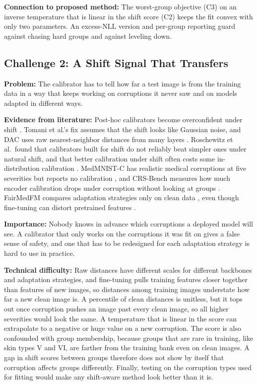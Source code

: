 \documentclass[sigconf,nonacm]{acmart}
\begin{document}
\textbf{Connection to proposed method:} The worst-group objective (C3) on an inverse temperature that is linear in the shift score (C2) keeps the fit convex with only two parameters. An excess-NLL version and per-group reporting guard against chasing hard groups and against leveling down.

\subsection{Challenge 2: A Shift Signal That Transfers}
\label{sec:ch2}

\textbf{Problem:} The calibrator has to tell how far a test image is from the training data in a way that keeps working on corruptions it never saw and on models adapted in different ways.

\textbf{Evidence from literature:} Post-hoc calibrators become overconfident under shift \cite{ovadia2019trust,tomani2021posthoc}. Tomani et al.'s fix assumes that the shift looks like Gaussian noise, and DAC uses raw nearest-neighbor distances from many layers \cite{tomani2023dac}. Roschewitz et al.\ found that calibrators built for shift do not reliably beat simpler ones under natural shift, and that better calibration under shift often costs some in-distribution calibration \cite{roschewitz2025where}. MedMNIST-C has realistic medical corruptions at five severities but reports no calibration \cite{disalvo2024medmnistc}, and CRS-Bench measures how much encoder calibration drops under corruption without looking at groups \cite{lin2026crsbench}. FairMedFM compares adaptation strategies only on clean data \cite{jin2024fairmedfm}, even though fine-tuning can distort pretrained features \cite{kumar2022finetuning}.

\textbf{Importance:} Nobody knows in advance which corruptions a deployed model will see. A calibrator that only works on the corruptions it was fit on gives a false sense of safety, and one that has to be redesigned for each adaptation strategy is hard to use in practice.

\textbf{Technical difficulty:} Raw distances have different scales for different backbones and adaptation strategies, and fine-tuning pulls training features closer together than features of new images, so distances among training images understate how far a new clean image is. A percentile of clean distances is unitless, but it tops out once corruption pushes an image past every clean image, so all higher severities would look the same. A temperature that is linear in the score can extrapolate to a negative or huge value on a new corruption. The score is also confounded with group membership, because groups that are rare in training, like skin types V and VI, are farther from the training bank even on clean images. A gap in shift scores between groups therefore does not show by itself that corruption affects groups differently. Finally, testing on the corruption types used for fitting would make any shift-aware method look better than it is.
\end{document}
